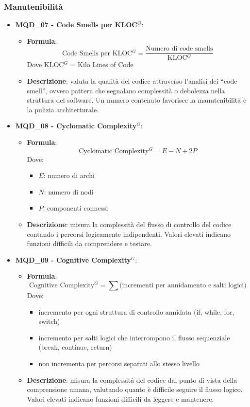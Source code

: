 \subsubsection{Manutenibilità}
\begin{itemize}
\item \textbf{MQD\_07 - Code Smells per KLOC$^G$}:
    \begin{itemize}
        \item \textbf{Formula}:
        \[
            \text{Code Smells per KLOC$^G$} =
            \frac{\text{Numero di code smells}}{\text{KLOC$^G$}}
        \]
        Dove KLOC$^G$ = Kilo Lines of Code
        \item \textbf{Descrizione}: valuta la qualità del codice attraverso l’analisi dei “code smell”, ovvero pattern che segnalano complessità o debolezza nella struttura del software. Un numero contenuto favorisce la manutenibilità e la pulizia architetturale.
    \end{itemize}

\item \textbf{MQD\_08 - Cyclomatic Complexity$^G$}:
    \begin{itemize}
        \item \textbf{Formula}:
        \[
            \text{Cyclomatic Complexity$^G$} = E - N + 2P
        \]
        Dove:
        \begin{itemize}
            \item $E$: numero di archi
            \item $N$: numero di nodi
            \item $P$: componenti connessi
        \end{itemize}
        \item \textbf{Descrizione}: misura la complessità del flusso di controllo del codice contando i percorsi logicamente indipendenti. Valori elevati indicano funzioni difficili da comprendere e testare.
    \end{itemize}

\item \textbf{MQD\_09 - Cognitive Complexity$^G$}:
\begin{itemize}
	\item \textbf{Formula}:
	\[
		\text{Cognitive Complexity$^G$} = \sum \text{(incrementi per annidamento e salti logici)}
	\]
	Dove:
	\begin{itemize}
		\item incremento per ogni struttura di controllo annidata (if, while, for, switch)
		\item incremento per salti logici che interrompono il flusso sequenziale (break, continue, return)
		\item non incrementa per percorsi separati allo stesso livello
	\end{itemize}
	\item \textbf{Descrizione}: misura la complessità del codice dal punto di vista della comprensione umana, valutando quanto è difficile seguire il flusso logico. Valori elevati indicano funzioni difficili da leggere e mantenere.
\end{itemize}

\end{itemize}